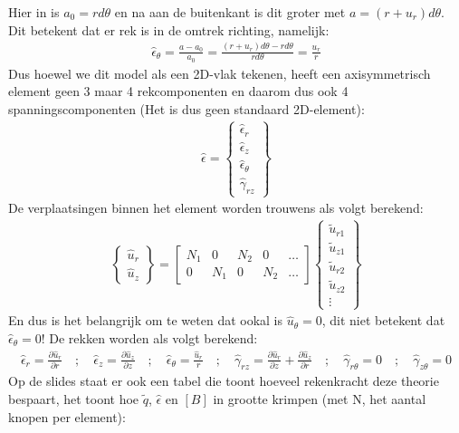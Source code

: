 \documentclass[a4paper,11pt,twoside]{report}
\begin{document}
Hier in is $a_0 = r d\theta$ en na aan de buitenkant is dit groter met $a = (r + u_r) d\theta$. Dit
betekent dat er rek is in de omtrek richting, namelijk:
\begin{align*}
    \hat{\epsilon}_\theta = \frac{a - a_0}{a_0} = \frac{(r + u_r) d\theta - r d\theta}{r d\theta} = \frac{u_r}{r}
\end{align*}
Dus hoewel we dit model als een 2D-vlak tekenen, heeft een axisymmetrisch element geen 3 maar 4
rekcomponenten en daarom dus ook 4 spanningscomponenten (Het is dus geen standaard 2D-element):
\begin{align*}
    \hat{\epsilon} = \begin{Bmatrix} \hat{\epsilon}_r \\ \hat{\epsilon}_z \\ \hat{\epsilon}_\theta \\ \hat{\gamma}_{rz} \end{Bmatrix}
\end{align*}
De verplaatsingen binnen het element worden trouwens als volgt berekend:
\begin{align*}
    \begin{Bmatrix}
        \hat{u}_r \\
        \hat{u}_z
    \end{Bmatrix} =
    \begin{bmatrix}
        N_1 & 0   & N_2 & 0   & \dots \\
        0   & N_1 & 0   & N_2 & \dots
    \end{bmatrix}
    \begin{Bmatrix}
        \tilde{u}_{r1} \\
        \tilde{u}_{z1} \\
        \tilde{u}_{r2} \\
        \tilde{u}_{z2} \\
        \vdots
    \end{Bmatrix}
\end{align*}
En dus is het belangrijk om te weten dat ookal is $\hat{u}_\theta = 0$, dit niet betekent dat
$\hat{\epsilon}_\theta = 0$! De rekken worden als volgt berekend:
\begin{align*}
    \hat{\epsilon}_r = \frac{\partial \hat{u}_r}{\partial r} \quad ; \quad
    \hat{\epsilon}_z = \frac{\partial \hat{u}_z}{\partial z} \quad ; \quad
    \hat{\epsilon}_\theta = \frac{\hat{u}_r}{r} \quad ; \quad
    \hat{\gamma}_{rz} = \frac{\partial \hat{u}_r}{\partial z} + \frac{\partial \hat{u}_z}{\partial r} \quad ; \quad
    \hat{\gamma}_{r\theta} = 0 \quad ; \quad
    \hat{\gamma}_{z\theta} = 0
\end{align*}
Op de slides staat er ook een tabel die toont hoeveel rekenkracht deze theorie bespaart, het toont
hoe $\tilde{q}$, $\hat{\epsilon}$ en $[B]$ in grootte krimpen (met N, het aantal knopen per
element):
\end{document}

